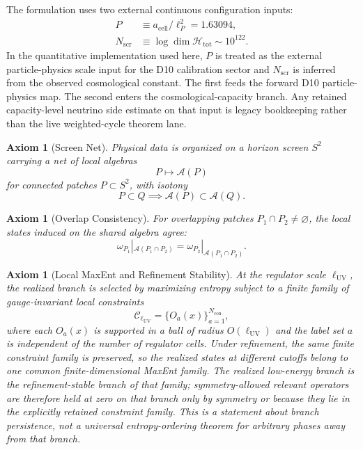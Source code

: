\documentclass[11pt]{article}
\newtheorem{axiom}[theorem]{Axiom}
\begin{document}
The formulation uses two external continuous configuration inputs:
\begin{align}
P &\equiv a_{\mathrm{cell}}/\ell_P^2 = 1.63094,\\
N_{\mathrm{scr}} &\equiv \log \dim \mathcal H_{\mathrm{tot}} \sim 10^{122}.
\end{align}
In the quantitative implementation used here, \(P\) is treated as the external particle-physics scale input for the D10 calibration sector and \(N_{\mathrm{scr}}\) is inferred from the observed cosmological constant. The first feeds the forward D10 particle-physics map. The second enters the cosmological-capacity branch. Any retained capacity-level neutrino side estimate on that input is legacy bookkeeping rather than the live weighted-cycle theorem lane.

\begin{axiom}[Screen Net]\label{ax:screen}
Physical data is organized on a horizon screen \(S^2\) carrying a net of local algebras
\[
P \longmapsto \mathcal A(P)
\]
for connected patches \(P\subset S^2\), with isotony
\[
P\subset Q \implies \mathcal A(P)\subset \mathcal A(Q).
\]
\end{axiom}

\begin{axiom}[Overlap Consistency]\label{ax:overlap}
For overlapping patches \(P_1\cap P_2\neq\varnothing\), the local states induced on the shared algebra agree:
\[
\omega_{P_1}|_{\mathcal A(P_1\cap P_2)}
=
\omega_{P_2}|_{\mathcal A(P_1\cap P_2)}.
\]
\end{axiom}

\begin{axiom}[Local MaxEnt and Refinement Stability]\label{ax:maxent}
At the regulator scale \(\ell_{\mathrm{UV}}\), the realized branch is selected by maximizing entropy subject to a finite family of gauge-invariant local constraints
\[
\mathcal C_{\ell_{\mathrm{UV}}}=\{O_a(x)\}_{a=1}^{N_{\mathrm{con}}},
\]
where each \(O_a(x)\) is supported in a ball of radius \(O(\ell_{\mathrm{UV}})\) and the label set \(a\) is independent of the number of regulator cells. Under refinement, the same finite constraint family is preserved, so the realized states at different cutoffs belong to one common finite-dimensional MaxEnt family. The realized low-energy branch is the refinement-stable branch of that family; symmetry-allowed relevant operators are therefore held at zero on that branch only by symmetry or because they lie in the explicitly retained constraint family. This is a statement about branch persistence, not a universal entropy-ordering theorem for arbitrary phases away from that branch.
\end{axiom}
\end{document}
